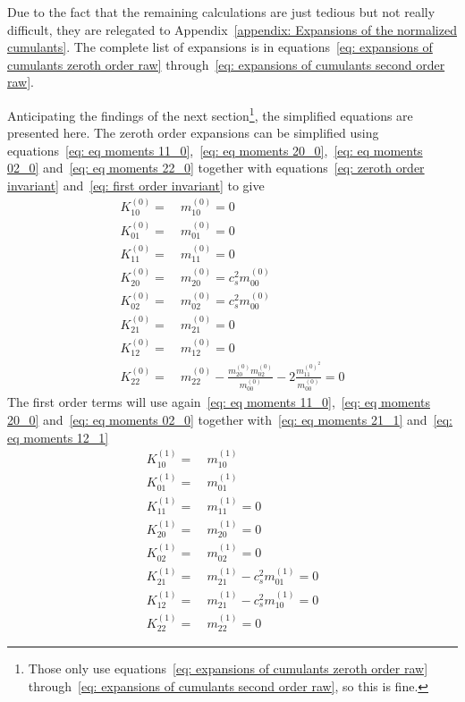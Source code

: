 Due to the fact that the remaining calculations are just tedious but not really difficult, they are relegated to Appendix~\ref{appendix: Expansions of the normalized cumulants}.
The complete list of expansions is in equations~\eqref{eq: expansions of cumulants zeroth order raw} through~\eqref{eq: expansions of cumulants second order raw}.

Anticipating the findings of the next
section\footnote{Those only use equations~\eqref{eq: expansions of cumulants zeroth order raw} through~\eqref{eq: expansions of cumulants second order raw}, so this is fine.}, the simplified equations are presented here.
The zeroth order expansions can be simplified using equations~\eqref{eq: eq moments 11_0},~\eqref{eq: eq moments 20_0},~\eqref{eq: eq moments 02_0} and~\eqref{eq: eq moments 22_0} together with equations~\eqref{eq: zeroth order invariant} and~\eqref{eq: first order invariant} to give
\begin{equation}
  \label{eq: expansions of cumulants zeroth order}
  \begin{aligned}
    K_{10}^{(0)} =&\ m_{10}^{(0)} = 0\\
    K_{01}^{(0)} =&\ m_{01}^{(0)} = 0\\
    K_{11}^{(0)} =&\ m_{11}^{(0)} = 0\\
    K_{20}^{(0)} =&\ m_{20}^{(0)} = c_s^2 m_{00}^{(0)}\\
    K_{02}^{(0)} =&\ m_{02}^{(0)} = c_s^2 m_{00}^{(0)}\\
    K_{21}^{(0)} =&\ m_{21}^{(0)} = 0\\
    K_{12}^{(0)} =&\ m_{12}^{(0)} = 0\\
    K_{22}^{(0)} =&\ m_{22}^{(0)} - \frac{ m_{20}^{(0)} m_{02}^{(0)} }{m_{00}^{(0)}} - 2\frac{ m_{11}^{{(0)}^2}}{m_{00}^{(0)}} = 0
  \end{aligned}
\end{equation}
The first order terms will use again~\eqref{eq: eq moments 11_0},~\eqref{eq: eq moments 20_0} and~\eqref{eq: eq moments 02_0} together with~\eqref{eq: eq moments 21_1} and~\eqref{eq: eq moments 12_1}
\begin{equation}
  \label{eq: expansions of cumulants first order}
  \begin{aligned}
    K_{10}^{(1)} =&\ m_{10}^{(1)}\\
    K_{01}^{(1)} =&\ m_{01}^{(1)}\\
    K_{11}^{(1)} =&\ m_{11}^{(1)} = 0 \\
    K_{20}^{(1)} =&\ m_{20}^{(1)} = 0\\
    K_{02}^{(1)} =&\ m_{02}^{(1)} = 0\\
    K_{21}^{(1)} =&\ m_{21}^{(1)}
    - c_s^2 m_{01}^{(1)} = 0 \\
    K_{12}^{(1)} =&\ m_{21}^{(1)}
    - c_s^2 m_{10}^{(1)} = 0 \\
    K_{22}^{(1)} =&\ m_{22}^{(1)} = 0
  \end{aligned}
\end{equation}
